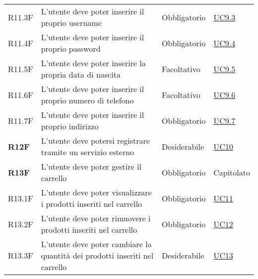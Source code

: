 \begin{center}
\begin{longtable}[!h]{p{50px} p{245px} p{75px} p{50px}}
        R11.3F                                & L'utente deve poter inserire il proprio username                                                    & Obbligatorio             & \hyperref[sec:UC9.3]{UC9.3}                    \\
        R11.4F                                & L'utente deve poter inserire il proprio password                                                    & Obbligatorio             & \hyperref[sec:UC9.4]{UC9.4}                    \\
        R11.5F                                & L'utente deve poter inserire la propria data di nascita                                             & Facoltativo             & \hyperref[sec:UC9.5]{UC9.5}                    \\
        R11.6F                                & L'utente deve poter inserire il proprio numero di telefono                                          & Facoltativo             & \hyperref[sec:UC9.6]{UC9.6}                    \\
        R11.7F                                & L'utente deve poter inserire il proprio indirizzo                                                   & Obbligatorio             & \hyperref[sec:UC9.7]{UC9.7}                    \\
        \textbf{R12F}                         & L'utente deve potersi registrare tramite un servizio esterno                                        & Desiderabile             & \hyperref[sec:UC10]{UC10}                      \\
        \textbf{R13F}                         & L'utente deve poter gestire il carrello                                                             & Obbligatorio             & Capitolato                                     \\
        R13.1F                                & L'utente deve poter visualizzare i prodotti inseriti nel carrello                                   & Obbligatorio             & \hyperref[sec:UC11]{UC11}                      \\
        R13.2F                                & L'utente deve poter rimuovere i prodotti inseriti nel carrello                                      & Obbligatorio             & \hyperref[sec:UC12]{UC12}                      \\
        R13.3F                                & L'utente deve poter cambiare la quantità dei prodotti inseriti nel carrello                         & Desiderabile             & \hyperref[sec:UC13]{UC13}                      \\

\end{longtable}
\end{center}
